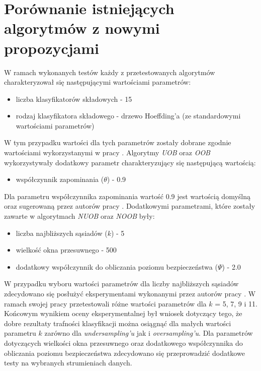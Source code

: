 \section{Porównanie istniejących algorytmów z nowymi propozycjami}
\label{Section:AlgorithmsComparison}

\noindent W ramach wykonanych testów każdy z przetestowanych algorytmów charakteryzował się następującymi wartościami parametrów:

\begin{itemize}
    \item liczba klasyfikatorów składowych - 15
    \item rodzaj klasyfikatora składowego - drzewo Hoeffding'a (ze standardowymi wartościami parametrów)
\end{itemize}

\noindent W tym przypadku wartości dla tych parametrów zostały dobrane zgodnie wartościami wykorzystanymi w pracy \cite{Article:TypyPrzykladow}. Algorytmy \textit{UOB} oraz \textit{OOB} wykorzystywały dodatkowy parametr charakteryzujący się następującą wartością:

\begin{itemize}
    \item współczynnik zapominania ($\theta$) - 0.9
\end{itemize}

\noindent Dla parametru współczynnika zapominania wartość 0.9 jest wartością domyślną oraz sugerowaną przez autorów pracy \cite{Article:OBSecond}. Dodatkowymi parametrami, które zostały zawarte w algorytmach \textit{NUOB} oraz \textit{NOOB} były:

\begin{itemize}
    \item liczba najbliższych sąsiadów ($k$) - 5
    \item wielkość okna przesuwnego - 500
    \item dodatkowy współczynnik do obliczania poziomu bezpieczeństwa ($\Psi$) - 2.0
\end{itemize}

\noindent W przypadku wyboru wartości parametrów dla liczby najbliższych sąsiadów zdecydowano się posłużyć eksperymentami wykonanymi przez autorów pracy \cite{Article:NNBag}. W ramach swojej pracy przetestowali różne wartości parametrów dla $k$ = 5, 7, 9 i 11. Końcowym wynikiem oceny eksperymentalnej był wniosek dotyczący tego, że dobre rezultaty trafności klasyfikacji można osiągnąć dla małych wartości parametru $k$ zarówno dla \textit{undersampling'u} jak i \textit{oversampling'u}. Dla parametrów dotyczących wielkości okna przesuwnego oraz dodatkowego współczynnika do obliczania poziomu bezpieczeństwa zdecydowano się przeprowadzić dodatkowe testy na wybranych strumieniach danych.

